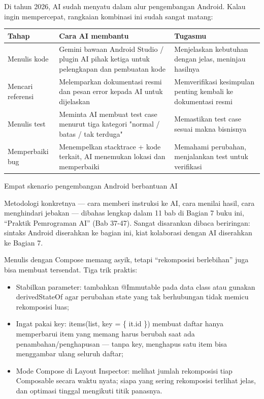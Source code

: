 
Di tahun 2026, AI sudah menyatu dalam alur pengembangan Android. Kalau ingin mempercepat, rangkaian kombinasi ini sudah sangat matang:

\begin{center}
\begin{tabularx}{\linewidth}{|X|X|X|}
\hline
\textbf{Tahap} & \textbf{Cara AI membantu} & \textbf{Tugasmu} \tabularnewline
\hline
Menulis kode & Gemini bawaan Android Studio / plugin AI pihak ketiga untuk pelengkapan dan pembuatan kode & Menjelaskan kebutuhan dengan jelas, meninjau hasilnya \tabularnewline
Mencari referensi & Melemparkan dokumentasi resmi dan pesan error kepada AI untuk dijelaskan & Memverifikasi kesimpulan penting kembali ke dokumentasi resmi \tabularnewline
Menulis test & Meminta AI membuat test case menurut tiga kategori "normal / batas / tak terduga" & Memastikan test case sesuai makna bisnisnya \tabularnewline
Memperbaiki bug & Menempelkan stacktrace + kode terkait, AI menemukan lokasi dan memperbaiki & Memahami perubahan, menjalankan test untuk verifikasi \tabularnewline
\hline
\end{tabularx}
\end{center}

\begin{center}\small\color{gray}Empat skenario pengembangan Android berbantuan AI\end{center}

Metodologi konkretnya — cara memberi instruksi ke AI, cara menilai hasil, cara menghindari jebakan — dibahas lengkap dalam 11 bab di Bagian 7 buku ini, “Praktik Pemrograman AI” (Bab 37-47). Sangat disarankan dibaca beriringan: sintaks Android diserahkan ke bagian ini, kiat kolaborasi dengan AI diserahkan ke Bagian 7.


Menulis dengan Compose memang asyik, tetapi “rekomposisi berlebihan” juga bisa membuat tersendat. Tiga trik praktis:

\begin{itemize}
  \item Stabilkan parameter: tambahkan @Immutable pada data class atau gunakan derivedStateOf agar perubahan state yang tak berhubungan tidak memicu rekomposisi luas;
  \item Ingat pakai key: items(list, key = \{ it.id \}) membuat daftar hanya memperbarui item yang memang harus berubah saat ada penambahan/penghapusan — tanpa key, menghapus satu item bisa menggambar ulang seluruh daftar;
  \item Mode Compose di Layout Inspector: melihat jumlah rekomposisi tiap Composable secara waktu nyata; siapa yang sering rekomposisi terlihat jelas, dan optimasi tinggal mengikuti titik panasnya.
\end{itemize}


